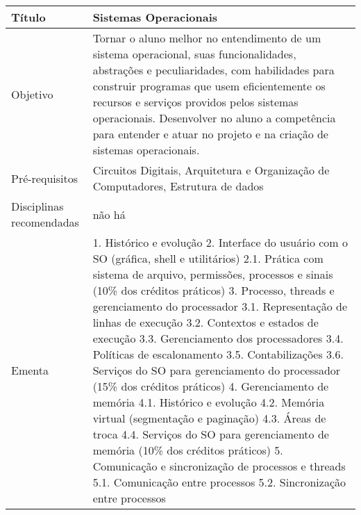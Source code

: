\begin{center}
\begin{tabular}{|p{4.5cm}|p{10.0cm}|} \hline
Título & Sistemas Operacionais \\ \hline
Objetivo & Tornar o aluno melhor no entendimento de um sistema operacional, suas funcionalidades, abstrações e peculiaridades, com habilidades para construir programas que usem eficientemente os recursos e serviços providos pelos sistemas operacionais. Desenvolver no aluno a competência para entender e atuar no projeto e na criação de sistemas operacionais. \\
\hline
Pré-requisitos & Circuitos Digitais, Arquitetura e Organização de Computadores, Estrutura de dados \\ \hline
Disciplinas recomendadas & não há \\ \hline
Ementa & 1. Histórico e evolução
2. Interface do usuário com o SO (gráfica, shell e utilitários)
	2.1. Prática com sistema de arquivo, permissões, processos e sinais (10\% dos créditos práticos)
3. Processo, threads e gerenciamento do processador
	3.1. Representação de linhas de execução
	3.2. Contextos e estados de execução
	3.3. Gerenciamento dos processadores
	3.4. Políticas de escalonamento
	3.5. Contabilizações
	3.6. Serviços do SO para gerenciamento do processador (15\% dos créditos práticos)
4. Gerenciamento de memória
	4.1. Histórico e evolução
	4.2. Memória virtual (segmentação e paginação)
	4.3. Áreas de troca
	4.4. Serviços do SO para gerenciamento de memória (10\% dos créditos práticos)
5. Comunicação e sincronização de processos e threads
	5.1. Comunicação entre processos
	5.2. Sincronização entre processos

\end{tabular}
\end{center}
